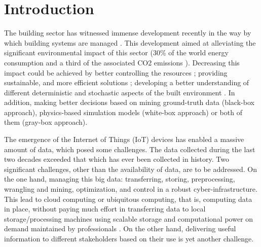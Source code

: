 \documentclass{scsSimAUDPaperFormat}
\begin{document}
\section{Introduction}
The building sector has witnessed immense development recently in the way by which building systems are managed \cite{ WongIntelligentReview}. This development aimed at alleviating the significant environmental impact of this sector (30\% of the world energy consumption and a third of the associated CO2 emissions \cite{Iea2013TrackingMinisterial}). Decreasing this impact could be achieved by better controlling the resources \cite{Allcott2010BehaviorPolicy}; providing sustainable, and more efficient solutions \cite{Zhang2019WholeLearning}; developing a better understanding of different deterministic and stochastic aspects of the built environment \cite{Brohus2012QuantificationApproach,ReviewsStochasticReview, USDepartmentofEnergy2018TechnologyReport, Chong2015UncertaintyApproach}. In addition, making better decisions based on mining ground-truth data (black-box approach)\cite{Molina-Solana2017DataReview}, physics-based simulation models (white-box approach)\cite{TardioliDataLevel,Molina-Solana2017DataReview} or both of them (gray-box approach)\cite{Zhang2019WholeLearning}. 

The emergence of the Internet of Things (IoT) devices has enabled a massive amount of data, which posed some challenges. The data collected during the last two decades exceeded that which has ever been collected in history\cite{Ramaswamy2015InternetReview}. Two significant challenges, other than the availability of data, are to be addressed. On the one hand, managing this big data: transferring, storing, preprocessing, wrangling and mining, optimization, and control in a robust cyber-infrastructure. This lead to cloud computing or ubiquitous computing, that is, computing data in place, without paying much effort in transferring data to local storage/processing machines using scalable storage and computational power on demand maintained by professionals \cite{MellTheTechnology,Bhardwaj2010Cloud,Dillon2010CloudChallenges}. On the other hand, delivering useful information to different stakeholders based on their use is yet another challenge.
\end{document}
